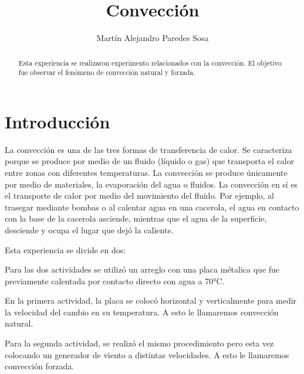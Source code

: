 \documentclass[12pt]{article}
\title{Convección}
\author{Martín Alejandro Paredes Sosa}
\makeatletter
\let\thetitle\@title
\let\theauthor\@author
\makeatother
\begin{document}
\begin{center}
{ \large \bfseries \thetitle}
\end{center}
	\begin{minipage}{\textwidth}
		\begin{center} 
			\theauthor 
			\end{center}
	\end{minipage}
	\begin{abstract}
		Esta experiencia se realizaron experimento relacionados con la convección. El objetivo fue observar el fenómeno de convección natural y forzada.
	\end{abstract}

\section{Introducción}
\vspace{-0.5cm}
La convección es una de las tres formas de transferencia de calor. Se caracteriza porque se produce por medio de un fluido (líquido o gas) que transporta el calor entre zonas con diferentes temperaturas. La convección se produce únicamente por medio de materiales, la evaporación del agua o fluidos. La convección en sí es el transporte de calor por medio del movimiento del fluido. Por ejemplo, al trasegar mediante bombas o al calentar agua en una cacerola, el agua en contacto con la base de la cacerola asciende, mientras que el agua de la superficie, desciende y ocupa el lugar que dejó la caliente.

Esta experiencia se divide en dos:

Para las dos actividades se utilizó un arreglo con una placa métalica que fue previamente calentada por contacto directo con agua a 70°C. 

En la primera actividad, la placa se colocó horizontal y verticalmente para medir la velocidad del cambio en su temperatura. A esto le llamaremos convección natural.

Para la segunda actividad, se realizó el mismo procedimiento pero esta vez colocando un generador de viento a distintas velocidades. A esto le llamaremos convección forzada.

\end{document}

